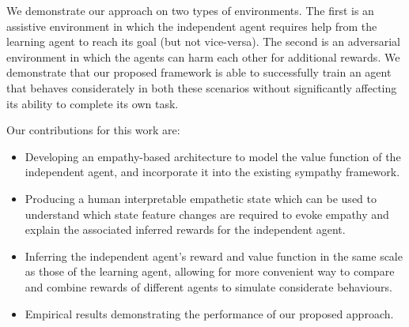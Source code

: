 

We demonstrate our approach on two types of environments. The first is an assistive environment in which the independent agent requires help from the learning agent to reach its goal (but not vice-versa). The second is an adversarial environment in which the agents can harm each other for additional rewards. We demonstrate that our proposed framework is able to successfully train an agent that behaves considerately in both these scenarios without significantly affecting its ability to complete its own task. 

Our contributions for this work are:

\begin{itemize}
    \item Developing an empathy-based architecture to model the value function of the independent agent, and incorporate it into the existing sympathy framework.
    \item Producing a human interpretable  empathetic state which can be used to understand which state feature changes are required to evoke empathy and explain the associated inferred rewards for the independent agent.
    \item Inferring the independent agent's reward and value function in the same scale as those of the learning agent, allowing for more convenient way to compare and combine rewards of different agents to simulate considerate behaviours.
    \item Empirical results demonstrating the performance of our proposed approach.
\end{itemize}

\fi